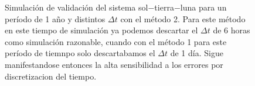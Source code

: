 \begin{figure}
{	\label{fig:ej1_m2_365_12}
	}
	\caption{
		Simulación de validación del sistema sol$-$tierra$-$luna para un período de 1 año y distintos $\Delta t$
		con el método 2.
		Para este método en este tiempo de simulación ya podemos descartar el $\Delta t$ de 6 horas como simulación razonable,
		cuando con el método 1 para este período de tiemnpo solo descartabamos el $\Delta t$ de 1 día.
		Sigue manifestandose entonces la alta sensibilidad a los errores por discretizacion del tiempo.
	}
	\label{ fig:res_ej1_m2_365 }
\end{figure}
